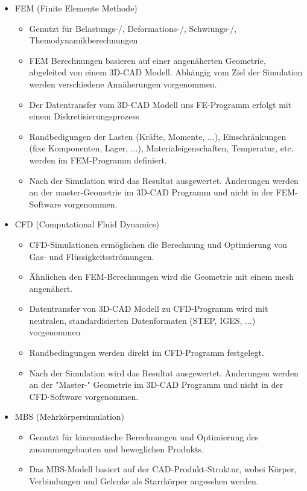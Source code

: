 \documentclass[10pt,a4paper,fleqn]{article}
\begin{document}
\begin{enumerate}
\begin{itemize}
\begin{itemize}
					\end{itemize}
				\item FEM (Finite Elemente Methode)
					\begin{itemize}
						\item Genutzt für Belastungs-/, Deformations-/, Schwiungs-/, Themodynamikberechnungen
						\item FEM Berechnungen basieren auf einer angenäherten Geometrie, abgeleited von einem 3D-CAD Modell. Abhängig vom Ziel der Simulation werden verschiedene Annäherungen vorgenommen.
						\item Der Datentransfer vom 3D-CAD Modell uns FE-Programm erfolgt mit einem Diskretisierungsprozess
						\item Randbedigungen der Lasten (Kräfte, Momente, $\dots$), Einschränkungen (fixe Komponenten, Lager, $\dots$), Materialeigenschaften, Temperatur, etc. werden im FEM-Programm definiert.
						\item Nach der Simulation wird das Resultat ausgewertet. Änderungen werden an der master-Geometrie im 3D-CAD Programm und nicht in der FEM-Software vorgenommen.
					\end{itemize}
\pagebreak
				\item CFD (Computational Fluid Dynamics)
					\begin{itemize}
						\item CFD-Simulationen ermöglichen die Berechnung und Optimierung von Gas- und Flüssigkeitsströmungen.
						\item Ähnlichen den FEM-Berechnungen wird die Geometrie mit einem mesh angenähert.
						\item Datentransfer von 3D-CAD Modell zu CFD-Programm wird mit neutralen, standardisierten Datenformaten (STEP, IGES, $\dots$) vorgenommen
						\item Randbedingungen werden direkt im CFD-Programm festgelegt.
						\item Nach der Simulation wird das Resultat ausgewertet. Änderungen werden an der "Master-" Geometrie im 3D-CAD Programm und nicht in der CFD-Software vorgenommen.
					\end{itemize}
				\item MBS (Mehrkörpersimulation)
					\begin{itemize}
						\item Genutzt für kinematische Berechnungen und Optimierung des zusammengebauten und beweglichen Produkts.
						\item Das MBS-Modell basiert auf der CAD-Produkt-Struktur, wobei Körper, Verbindungen und Gelenke als Starrkörper angesehen werden. 

\end{itemize}
\end{itemize}
\end{enumerate}
\end{document}
